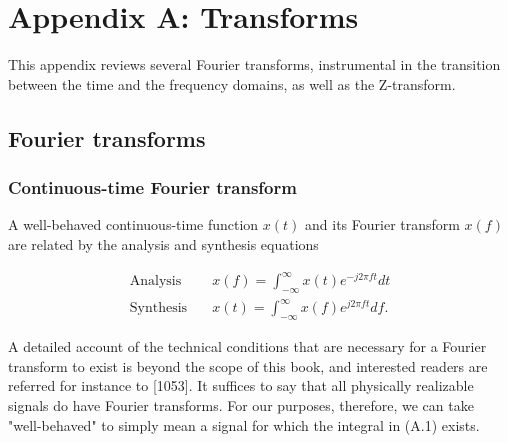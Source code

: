 \documentclass[a4paper, 12pt]{book}
\begin{document}
\setcounter{chapter}{1}
\setcounter{section}{0}
\chapter*{Appendix A: Transforms}

\begin{purplebox}
This appendix reviews several Fourier transforms, instrumental in the transition between the time and the frequency domains, as well as the Z-transform.
\end{purplebox}

\begin{center}
\end{center}

\section{Fourier transforms}

\subsection{Continuous-time Fourier transform}

A well-behaved continuous-time function $x(t)$ and its Fourier transform $x(f)$ are related by the analysis and synthesis equations

\begin{align}
    \text{Analysis} \quad & x(f) = \int_{-\infty}^{\infty}x(t)e^{-j2\pi ft}dt \tag{A.1} \\
    \text{Synthesis} \quad & x(t) = \int_{-\infty}^{\infty}x(f)e^{j2\pi ft}df. \tag{A.2}
\end{align}

A detailed account of the technical conditions that are necessary for a Fourier transform to exist is beyond the scope of this book, and interested readers are referred for instance to [1053]. It suffices to say that all physically realizable signals do have Fourier transforms. For our purposes, therefore, we can take "well-behaved" to simply mean a signal for which the integral in (A.1) exists.
\end{document}
